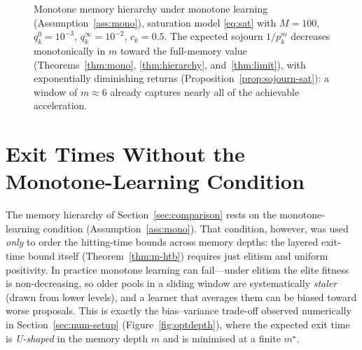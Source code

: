 \documentclass[11pt,a4paper]{article}
\begin{document}
\begin{figure}[ht]
\centering
{}
\caption{Monotone memory hierarchy under monotone learning
  (Assumption~\ref{ass:mono}), saturation model \eqref{eq:sat} with $M=100$,
  $q_k^0=10^{-3}$, $q_k^\infty=10^{-2}$, $c_k=0.5$.  The expected sojourn
  $1/p_k^m$ decreases monotonically in $m$ toward the full-memory value
  (Theorems~\ref{thm:mono}, \ref{thm:hierarchy}, and~\ref{thm:limit}), with exponentially
  diminishing returns (Proposition~\ref{prop:sojourn-sat}): a window of
  $m\approx6$ already captures nearly all of the achievable
  acceleration.}
\label{fig:hierarchy}
\end{figure}

\section{Exit Times Without the Monotone-Learning Condition}
\label{sec:nonmonotone}

The memory hierarchy of Section~\ref{sec:comparison} rests on the
monotone-learning condition (Assumption~\ref{ass:mono}).  That condition, however,
was used \emph{only} to order the hitting-time bounds across memory
depths: the layered exit-time bound itself (Theorem~\ref{thm:m-htb})
requires just elitism and uniform positivity.  In practice monotone
learning can fail---under elitism the elite fitness is non-decreasing, so
older pools in a sliding window are systematically \emph{staler} (drawn
from lower levels), and a learner that averages them can be biased toward
worse proposals.  This is exactly the bias--variance trade-off observed
numerically in Section~\ref{sec:num-setup} (Figure~\ref{fig:optdepth}),
where the expected exit time is \emph{U-shaped} in the memory depth $m$
and is minimised at a finite $m^\star$.
\end{document}
